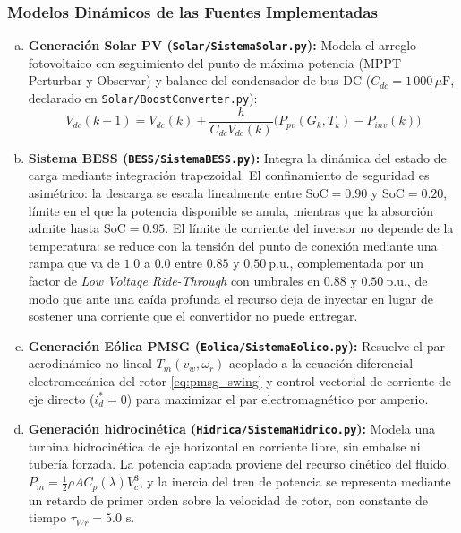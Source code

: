 \subsubsection{Modelos Dinámicos de las Fuentes Implementadas}
\begin{enumerate}[a)]
    \item \textbf{Generación Solar PV (\texttt{Solar/SistemaSolar.py}):} Modela el arreglo fotovoltaico con seguimiento del punto de máxima potencia (MPPT Perturbar y Observar) y balance del condensador de bus DC ($C_{dc} = 1\,000\,\mu\text{F}$, declarado en \texttt{Solar/BoostConverter.py}):
    \[
    V_{dc}(k+1) = V_{dc}(k) + \frac{h}{C_{dc} V_{dc}(k)} \big(P_{pv}(G_k, T_k) - P_{inv}(k) \big)
    \]
    
    \item \textbf{Sistema BESS (\texttt{BESS/SistemaBESS.py}):} Integra la dinámica del estado de carga mediante integración trapezoidal. El confinamiento de seguridad es asimétrico: la descarga se escala linealmente entre $\text{SoC} = 0.90$ y $\text{SoC} = 0.20$, límite en el que la potencia disponible se anula, mientras que la absorción admite hasta $\text{SoC} = 0.95$. El límite de corriente del inversor no depende de la temperatura: se reduce con la tensión del punto de conexión mediante una rampa que va de $1.0$ a $0.0$ entre $0.85$ y $0.50\ \text{p.u.}$, complementada por un factor de \textit{Low Voltage Ride-Through} con umbrales en $0.88$ y $0.50\ \text{p.u.}$, de modo que ante una caída profunda el recurso deja de inyectar en lugar de sostener una corriente que el convertidor no puede entregar.
    
    \item \textbf{Generación Eólica PMSG (\texttt{Eolica/SistemaEolico.py}):} Resuelve el par aerodinámico no lineal $T_m(v_w, \omega_r)$ acoplado a la ecuación diferencial electromecánica del rotor \eqref{eq:pmsg_swing} y control vectorial de corriente de eje directo ($i_d^* = 0$) para maximizar el par electromagnético por amperio.
    
    \item \textbf{Generación hidrocinética (\texttt{Hidrica/SistemaHidrico.py}):} Modela una turbina hidrocinética de eje horizontal en corriente libre, sin embalse ni tubería forzada. La potencia captada proviene del recurso cinético del fluido, $P_m = \frac{1}{2}\rho A C_p(\lambda) V_c^3$, y la inercia del tren de potencia se representa mediante un retardo de primer orden sobre la velocidad de rotor, con constante de tiempo $\tau_{Wr} = 5.0\text{ s}$.
    

\end{enumerate}
